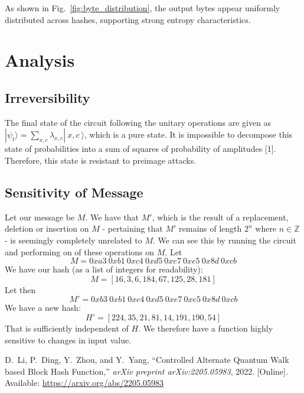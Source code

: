 \documentclass[conference]{IEEEtran}
\begin{document}
As shown in Fig.~\ref{fig:byte_distribution}, the output bytes appear uniformly distributed across hashes, supporting strong entropy characteristics.

\section{Analysis}
\subsection{Irreversibility}
The final state of the circuit following the unitary operations are given as $|\psi_{t}\rangle=\sum_{x,c}\lambda_{x,c}|\ x,c \ \rangle$, which is a pure state. It is impossible to decompose this state of probabilities into a sum of squares of probability of amplitudes [1]. Therefore, this state is resistant to preimage attacks. 
\subsection{Sensitivity of Message}
Let our message be $M$. We have that $M'$, which is the result of a replacement, deletion or insertion on $M$ - pertaining that $M'$ remains of length $2^n$ where $n\in \mathbb{Z}$ - is seemingly completely unrelated to $M$. We can see this by running the circuit and performing on of these operations on $M$. Let
\[M = 0xa3 \  0xb1 \  0xc4 \  0xd5 \  0xe7 \  0xe5 \  0x8d \ 0xcb\]
We have our hash (as a list of integers for readability):
\[M = [16, 3, 6, 184, 67, 125, 28, 181]\]
Let then 
\[M' = 0xb3 \  0xb1 \  0xc4 \  0xd5 \  0xe7 \  0xe5 \  0x8d \  0xcb\]
We have a new hash:
\[H' = [224, 35, 21, 81, 14, 191, 190, 54]\]
That is sufficiently independent of $H$. We therefore have a function highly sensitive to changes in input value.



\begin{thebibliography}{1}

D.~Li, P.~Ding, Y.~Zhou, and Y.~Yang, ``Controlled Alternate Quantum Walk based Block Hash Function,'' \textit{arXiv preprint arXiv:2205.05983}, 2022. [Online]. Available: \url{https://arxiv.org/abs/2205.05983}

\end{thebibliography}
\end{document}
